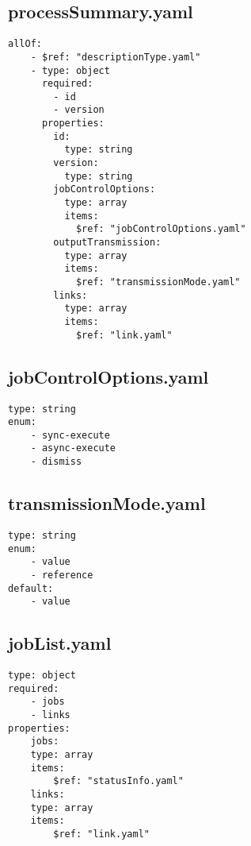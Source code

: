 \subsection{processSummary.yaml}
\begin{lstlisting}[caption={processSummary.yaml}, style = JSON]
allOf:
    - $ref: "descriptionType.yaml"
    - type: object
      required:
        - id
        - version
      properties:
        id:
          type: string
        version:
          type: string
        jobControlOptions:
          type: array
          items:
            $ref: "jobControlOptions.yaml"
        outputTransmission:
          type: array
          items:
            $ref: "transmissionMode.yaml"
        links:
          type: array
          items:
            $ref: "link.yaml"
\end{lstlisting}\label{appendixprocessSummaryyaml} 

\subsection{jobControlOptions.yaml}
\begin{lstlisting}[caption={jobControlOptions.yaml}, style = JSON]
type: string
enum:
    - sync-execute
    - async-execute
    - dismiss
\end{lstlisting}\label{appendixjobControlOptionsyaml} 

\subsection{transmissionMode.yaml}
\begin{lstlisting}[caption={transmissionMode.yaml}, style = JSON]
type: string
enum:
    - value
    - reference
default:
    - value
\end{lstlisting}\label{appendixtransmissionModeyaml} 

\subsection{jobList.yaml}
\begin{lstlisting}[caption={jobList.yaml}, style = JSON]
type: object
required:
    - jobs
    - links
properties:
    jobs:
    type: array
    items:
        $ref: "statusInfo.yaml"
    links:
    type: array
    items:
        $ref: "link.yaml"
\end{lstlisting}\label{appendixjobListyaml} 

